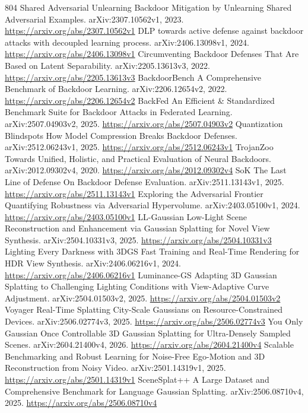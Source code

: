 \documentclass[11pt]{article}
\begin{document}
\begin{thebibliography}{804}
 Shared Adversarial Unlearning Backdoor Mitigation by Unlearning Shared Adversarial Examples. arXiv:2307.10562v1, 2023. \url{https://arxiv.org/abs/2307.10562v1}
 DLP towards active defense against backdoor attacks with decoupled learning process. arXiv:2406.13098v1, 2024. \url{https://arxiv.org/abs/2406.13098v1}
 Circumventing Backdoor Defenses That Are Based on Latent Separability. arXiv:2205.13613v3, 2022. \url{https://arxiv.org/abs/2205.13613v3}
 BackdoorBench A Comprehensive Benchmark of Backdoor Learning. arXiv:2206.12654v2, 2022. \url{https://arxiv.org/abs/2206.12654v2}
 BackFed An Efficient \& Standardized Benchmark Suite for Backdoor Attacks in Federated Learning. arXiv:2507.04903v2, 2025. \url{https://arxiv.org/abs/2507.04903v2}
 Quantization Blindspots How Model Compression Breaks Backdoor Defenses. arXiv:2512.06243v1, 2025. \url{https://arxiv.org/abs/2512.06243v1}
 TrojanZoo Towards Unified, Holistic, and Practical Evaluation of Neural Backdoors. arXiv:2012.09302v4, 2020. \url{https://arxiv.org/abs/2012.09302v4}
 SoK The Last Line of Defense On Backdoor Defense Evaluation. arXiv:2511.13143v1, 2025. \url{https://arxiv.org/abs/2511.13143v1}
 Exploring the Adversarial Frontier Quantifying Robustness via Adversarial Hypervolume. arXiv:2403.05100v1, 2024. \url{https://arxiv.org/abs/2403.05100v1}
 LL-Gaussian Low-Light Scene Reconstruction and Enhancement via Gaussian Splatting for Novel View Synthesis. arXiv:2504.10331v3, 2025. \url{https://arxiv.org/abs/2504.10331v3}
 Lighting Every Darkness with 3DGS Fast Training and Real-Time Rendering for HDR View Synthesis. arXiv:2406.06216v1, 2024. \url{https://arxiv.org/abs/2406.06216v1}
 Luminance-GS Adapting 3D Gaussian Splatting to Challenging Lighting Conditions with View-Adaptive Curve Adjustment. arXiv:2504.01503v2, 2025. \url{https://arxiv.org/abs/2504.01503v2}
 Voyager Real-Time Splatting City-Scale Gaussians on Resource-Constrained Devices. arXiv:2506.02774v3, 2025. \url{https://arxiv.org/abs/2506.02774v3}
 You Only Gaussian Once Controllable 3D Gaussian Splatting for Ultra-Densely Sampled Scenes. arXiv:2604.21400v4, 2026. \url{https://arxiv.org/abs/2604.21400v4}
 Scalable Benchmarking and Robust Learning for Noise-Free Ego-Motion and 3D Reconstruction from Noisy Video. arXiv:2501.14319v1, 2025. \url{https://arxiv.org/abs/2501.14319v1}
 SceneSplat++ A Large Dataset and Comprehensive Benchmark for Language Gaussian Splatting. arXiv:2506.08710v4, 2025. \url{https://arxiv.org/abs/2506.08710v4}

\end{thebibliography}
\end{document}
